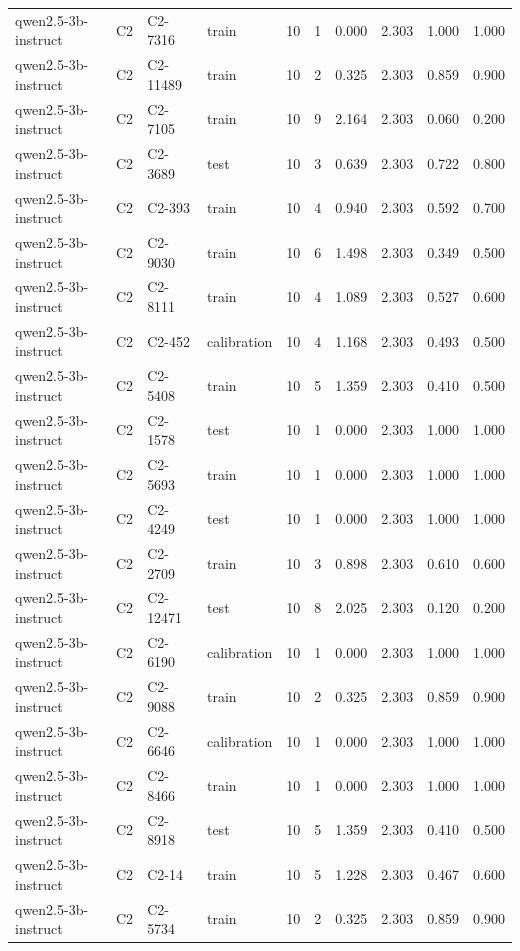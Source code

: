 \begin{table}
\begin{tabular}{llllrrrrrr}
qwen2.5-3b-instruct & C2 & C2-7316 & train & 10 & 1 & 0.000 & 2.303 & 1.000 & 1.000 \\
qwen2.5-3b-instruct & C2 & C2-11489 & train & 10 & 2 & 0.325 & 2.303 & 0.859 & 0.900 \\
qwen2.5-3b-instruct & C2 & C2-7105 & train & 10 & 9 & 2.164 & 2.303 & 0.060 & 0.200 \\
qwen2.5-3b-instruct & C2 & C2-3689 & test & 10 & 3 & 0.639 & 2.303 & 0.722 & 0.800 \\
qwen2.5-3b-instruct & C2 & C2-393 & train & 10 & 4 & 0.940 & 2.303 & 0.592 & 0.700 \\
qwen2.5-3b-instruct & C2 & C2-9030 & train & 10 & 6 & 1.498 & 2.303 & 0.349 & 0.500 \\
qwen2.5-3b-instruct & C2 & C2-8111 & train & 10 & 4 & 1.089 & 2.303 & 0.527 & 0.600 \\
qwen2.5-3b-instruct & C2 & C2-452 & calibration & 10 & 4 & 1.168 & 2.303 & 0.493 & 0.500 \\
qwen2.5-3b-instruct & C2 & C2-5408 & train & 10 & 5 & 1.359 & 2.303 & 0.410 & 0.500 \\
qwen2.5-3b-instruct & C2 & C2-1578 & test & 10 & 1 & 0.000 & 2.303 & 1.000 & 1.000 \\
qwen2.5-3b-instruct & C2 & C2-5693 & train & 10 & 1 & 0.000 & 2.303 & 1.000 & 1.000 \\
qwen2.5-3b-instruct & C2 & C2-4249 & test & 10 & 1 & 0.000 & 2.303 & 1.000 & 1.000 \\
qwen2.5-3b-instruct & C2 & C2-2709 & train & 10 & 3 & 0.898 & 2.303 & 0.610 & 0.600 \\
qwen2.5-3b-instruct & C2 & C2-12471 & test & 10 & 8 & 2.025 & 2.303 & 0.120 & 0.200 \\
qwen2.5-3b-instruct & C2 & C2-6190 & calibration & 10 & 1 & 0.000 & 2.303 & 1.000 & 1.000 \\
qwen2.5-3b-instruct & C2 & C2-9088 & train & 10 & 2 & 0.325 & 2.303 & 0.859 & 0.900 \\
qwen2.5-3b-instruct & C2 & C2-6646 & calibration & 10 & 1 & 0.000 & 2.303 & 1.000 & 1.000 \\
qwen2.5-3b-instruct & C2 & C2-8466 & train & 10 & 1 & 0.000 & 2.303 & 1.000 & 1.000 \\
qwen2.5-3b-instruct & C2 & C2-8918 & test & 10 & 5 & 1.359 & 2.303 & 0.410 & 0.500 \\
qwen2.5-3b-instruct & C2 & C2-14 & train & 10 & 5 & 1.228 & 2.303 & 0.467 & 0.600 \\
qwen2.5-3b-instruct & C2 & C2-5734 & train & 10 & 2 & 0.325 & 2.303 & 0.859 & 0.900 \\

\end{tabular}
\end{table}
